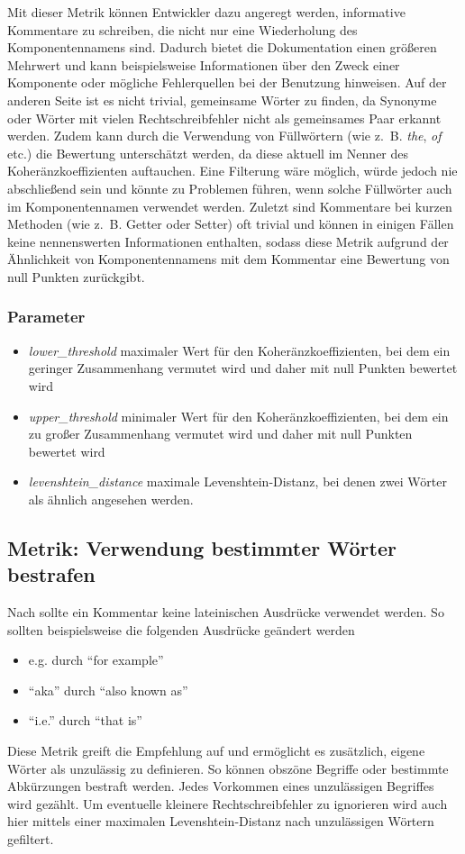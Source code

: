Mit dieser Metrik können Entwickler dazu angeregt werden, informative Kommentare zu schreiben, die nicht nur eine Wiederholung des Komponentennamens sind. Dadurch bietet die Dokumentation einen größeren Mehrwert und kann beispielsweise Informationen über den Zweck einer Komponente oder mögliche Fehlerquellen bei der Benutzung hinweisen. Auf der anderen Seite ist es nicht trivial, gemeinsame Wörter zu finden, da Synonyme oder Wörter mit vielen Rechtschreibfehler nicht als gemeinsames Paar erkannt werden. Zudem  kann durch die Verwendung von Füllwörtern (wie z.~B. \textit{the}, \textit{of} etc.) die Bewertung unterschätzt werden, da diese aktuell im Nenner des Koheränzkoeffizienten auftauchen. Eine Filterung wäre möglich, würde jedoch nie abschließend sein und könnte zu Problemen führen, wenn solche Füllwörter auch im Komponentennamen verwendet werden. Zuletzt sind Kommentare bei kurzen Methoden (wie z.~B. Getter oder Setter) oft trivial und können in einigen Fällen keine nennenswerten Informationen enthalten, sodass diese Metrik aufgrund der Ähnlichkeit von Komponentennamens mit dem Kommentar eine Bewertung von null Punkten zurückgibt. 

  \subsubsection{Parameter}
  \begin{itemize}
     \item \textit{lower\_threshold} maximaler Wert für den  Koheränzkoeffizienten, bei dem ein geringer Zusammenhang vermutet wird und daher mit null Punkten bewertet wird
    \item \textit{upper\_threshold} minimaler Wert für den  Koheränzkoeffizienten, bei dem ein zu großer Zusammenhang vermutet wird und daher mit null Punkten bewertet wird
\item \textit{levenshtein\_distance} maximale Levenshtein-Distanz, bei denen zwei Wörter als ähnlich angesehen werden. 
 \end{itemize}
\subsection{Metrik: Verwendung bestimmter Wörter bestrafen}\label{chapter:metric_certain_words}
Nach \cite{HowtoWriteDocCommentsfortheJavadocTool} sollte ein Kommentar keine lateinischen Ausdrücke verwendet werden. So sollten beispielsweise die folgenden Ausdrücke geändert werden
\begin{itemize}
    \item {e.g.} durch \enquote{for example}
    \item \enquote{aka} durch \enquote{also known as}
    \item \enquote{i.e.} durch \enquote{that is} 
    
\end{itemize}
Diese Metrik greift die Empfehlung auf und ermöglicht es zusätzlich, eigene Wörter als unzulässig zu definieren. So können obszöne Begriffe oder bestimmte Abkürzungen bestraft werden. Jedes Vorkommen eines unzulässigen Begriffes wird gezählt. Um eventuelle kleinere Rechtschreibfehler zu ignorieren wird auch hier mittels einer maximalen Levenshtein-Distanz nach unzulässigen Wörtern gefiltert.

